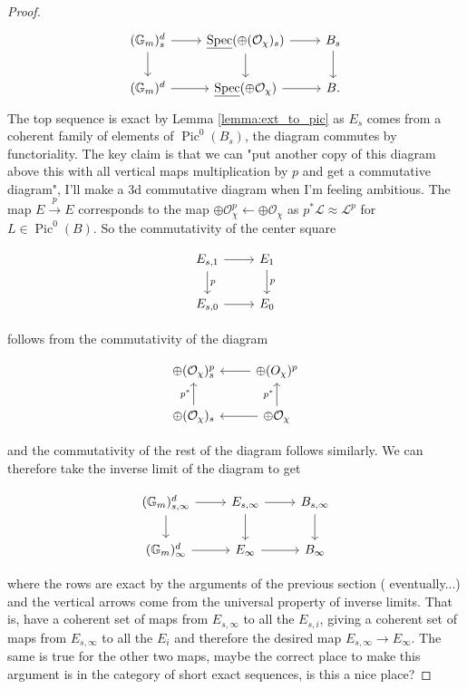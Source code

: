 \documentclass[11pt,oneside]{amsart}
\theoremstyle{theorem}
\theoremstyle{definition}
\theoremstyle{remark}
\begin{document}
\begin{proof}
\[
\begin{tikzcd}
(\mathbb G_m)^d_s \arrow{r}{} \arrow{d}{} & \underline{\operatorname{Spec}}(\oplus (\mathcal O_\chi)_s) \arrow{r}{}  \arrow{d}{} & B_s  \arrow{d}{} \\ 
(\mathbb G_m)^d  \arrow{r}{} & \underline{\operatorname{Spec}}(\oplus \mathcal O_\chi) \arrow{r}{} & B. 
\end{tikzcd}
\]
The top sequence is exact by Lemma \ref{lemma:ext_to_pic} as $E_s$ comes from a coherent family of elements of $\operatorname{Pic}^0(B_s)$, the diagram commutes {\color{purple} by functoriality}. The key claim is that we can {\color{purple} "put another copy of this diagram above this with all vertical maps multiplication by $p$ and get a commutative diagram", I'll make a 3d commutative diagram when I'm feeling ambitious}. The map $E\xrightarrow{p} E$ corresponds to the map $\oplus \mathcal O_\chi^p\leftarrow \oplus \mathcal O_\chi$ as $p^*\mathcal L\approx \mathcal L^p$ for $L\in \operatorname{Pic}^0(B)$. So the commutativity of the center square 

\[
\begin{tikzcd}
E_{s,1} \arrow{r}{}  \arrow{d}{p} & E_1  \arrow{d}{p} \\ 
E_{s,0} \arrow{r}{} & E_0
\end{tikzcd}
\]

follows from the commutativity of the diagram

\[
\begin{tikzcd}
\oplus (\mathcal O_\chi)^p_s  & \oplus \mathcal (O_\chi)^p \arrow{l}{}  \\ 
\oplus (\mathcal O_\chi)_s \arrow{u}{p^*} & \oplus \mathcal O_\chi   \arrow{l}{}  \arrow{u}{p^*}  
\end{tikzcd}
\]

and the commutativity of the rest of the diagram follows similarly. We can therefore take the inverse limit of the diagram to get 

\[
\begin{tikzcd}
(\mathbb G_m)^d_{s,\infty} \arrow{r}{} \arrow{d}{} & E_{s,\infty} \arrow{r}{}  \arrow{d}{} & B_{s,\infty}  \arrow{d}{} \\ 
(\mathbb G_m)^d_\infty  \arrow{r}{} & E_\infty \arrow{r}{} & B_\infty 
\end{tikzcd}
\]

where the rows are exact by the arguments of the previous section ({\color{purple} eventually...}) and the vertical arrows come from the universal property of inverse limits. That is, have a coherent set of maps from $E_{s,\infty}$ to all the $E_{s,i}$, giving a coherent set of maps from $E_{s,\infty}$ to all the $E_i$ and therefore the desired map $E_{s,\infty}\rightarrow E_\infty$. The same is true for the other two maps, {\color{purple} maybe the correct place to make this argument is in the category of short exact sequences, is this a nice place?}


\end{proof}
\end{document}
